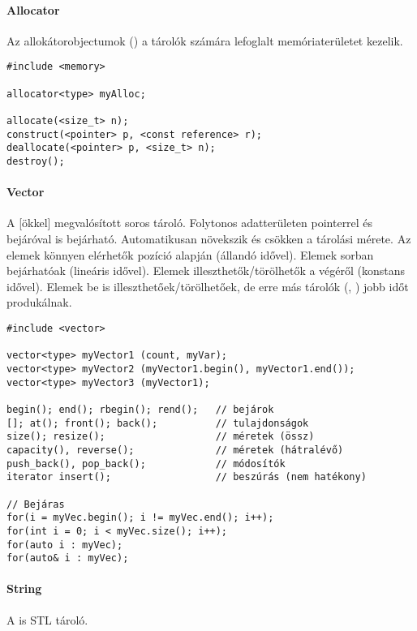 \documentclass[../../main.tex]{subfiles}
\begin{document}
\paragraph*{Allocator}

Az allokátorobjectumok () a tárolók számára lefoglalt
memóriaterületet kezelik.

\begin{verbatim}
#include <memory>

allocator<type> myAlloc;

allocate(<size_t> n);
construct(<pointer> p, <const reference> r);
deallocate(<pointer> p, <size_t> n);
destroy();
\end{verbatim}

\paragraph*{Vector}

A  [ökkel] megvalósított soros tároló.
Folytonos adatterületen pointerrel és bejáróval is bejárható.
Automatikusan növekszik és csökken a tárolási mérete. Az elemek könnyen
elérhetők pozíció alapján (állandó idővel). Elemek sorban bejárhatóak
(lineáris idővel). Elemek illeszthetők/törölhetők a végéről (konstans idővel).
Elemek be is illeszthetőek/törölhetőek, de erre más tárolók (,
) jobb időt produkálnak.

\begin{verbatim}
#include <vector>

vector<type> myVector1 (count, myVar);
vector<type> myVector2 (myVector1.begin(), myVector1.end());
vector<type> myVector3 (myVector1);

begin(); end(); rbegin(); rend();   // bejárok
[]; at(); front(); back();          // tulajdonságok
size(); resize();                   // méretek (össz)
capacity(), reverse();              // méretek (hátralévő)
push_back(), pop_back();            // módosítók
iterator insert();                  // beszúrás (nem hatékony)

// Bejáras
for(i = myVec.begin(); i != myVec.end(); i++);
for(int i = 0; i < myVec.size(); i++);
for(auto i : myVec);
for(auto& i : myVec);
\end{verbatim}

\paragraph*{String} A  is STL tároló.
\end{document}
